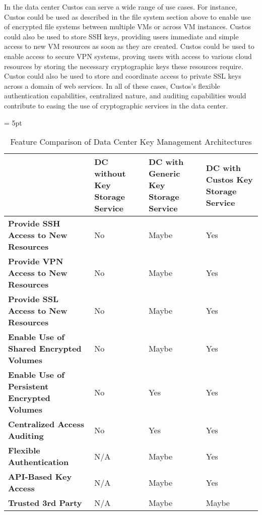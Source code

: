 In the data center Custos can serve a wide range of use cases. For
instance, Custos could be used as described in the file system section
above to enable use of encrypted file systems between multiple VMs or
across VM instances. Custos could also be used to store SSH keys,
providing users immediate and simple access to new VM resources as
soon as they are created. Custos could be used to enable access to
secure VPN systems, proving users with access to various cloud
resources by storing the necessary cryptographic keys these resources
require. Custos could also be used to store and coordinate access to
private SSL keys across a domain of web services. In all of these
cases, Custos's flexible authentication capabilities, centralized
nature, and auditing capabilities would contribute to easing the use
of cryptographic services in the data center.

\begin{table}[!tb]
  \vspace{5ex}
  \begin{center}
    \tabulinesep = 5pt
    \begin{tabu} to \textwidth
      { | X[1.5,c,m]
        | X[1,c,m]
        | X[1,c,m]
        | X[1,c,m]
        | }
      \hline
      & \textbf{DC without Key Storage Service}
      & \textbf{DC with Generic Key Storage Service}
      & \textbf{DC with Custos Key Storage Service}
      \\ \hline
      \textbf{Provide SSH Access to New Resources}
      & No & Maybe & Yes
      \\ \hline
      \textbf{Provide VPN Access to New Resources}
      & No & Maybe & Yes
      \\ \hline
      \textbf{Provide SSL Access to New Resources}
      & No & Maybe & Yes
      \\ \hline
      \textbf{Enable Use of Shared Encrypted Volumes}
      & No & Maybe & Yes
      \\ \hline
      \textbf{Enable Use of Persistent Encrypted Volumes}
      & No & Yes & Yes
      \\ \hline
      \textbf{Centralized Access Auditing}
      & No & Yes & Yes
      \\ \hline
      \textbf{Flexible Authentication}
      & N/A & Maybe & Yes
      \\ \hline
      \textbf{API-Based Key Access}
      & N/A & Maybe & Yes
      \\ \hline
      \textbf{Trusted 3rd Party}
      & N/A & Maybe & Maybe
      \\ \hline
      \end{tabu}
  \end{center}
  \caption{Feature Comparison of Data Center Key Management Architectures}
  \label{tab:comp-dc}
\end{table}

